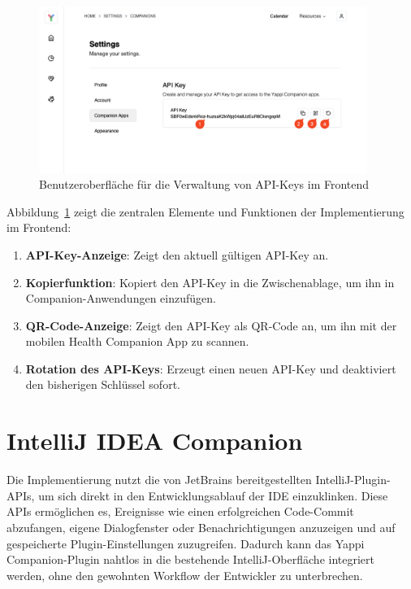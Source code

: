 \documentclass[12pt,a4paper]{report}
\begin{document}
\begin{figure}[H]
  \centering
  \includegraphics[width=0.95\textwidth]{../figures/yappi-settings-apikey.jpg}
  \caption{Benutzeroberfläche für die Verwaltung von API-Keys im Frontend}
  \label{fig:apikey-frontend}
\end{figure}

Abbildung~\ref{fig:apikey-frontend} zeigt die zentralen Elemente und Funktionen der Implementierung im Frontend:

\begin{enumerate}
  \item \textbf{API-Key-Anzeige}: Zeigt den aktuell gültigen API-Key an.
  \item \textbf{Kopierfunktion}: Kopiert den API-Key in die Zwischenablage, um ihn in Companion-Anwendungen einzufügen.
  \item \textbf{QR-Code-Anzeige}: Zeigt den API-Key als QR-Code an, um ihn mit der mobilen Health Companion App zu scannen.
  \item \textbf{Rotation des API-Keys}: Erzeugt einen neuen API-Key und deaktiviert den bisherigen Schlüssel sofort.
\end{enumerate}


\section{IntelliJ IDEA Companion}

Die Implementierung nutzt die von JetBrains bereitgestellten IntelliJ-Plugin-APIs, um sich direkt in den Entwicklungsablauf der
IDE einzuklinken. Diese APIs ermöglichen es, Ereignisse wie einen erfolgreichen Code-Commit abzufangen, eigene Dialogfenster oder
Benachrichtigungen anzuzeigen und auf gespeicherte Plugin-Einstellungen zuzugreifen. Dadurch kann das Yappi Companion-Plugin
nahtlos in die bestehende IntelliJ-Oberfläche integriert werden, ohne den gewohnten Workflow der Entwickler zu unterbrechen.
\end{document}
